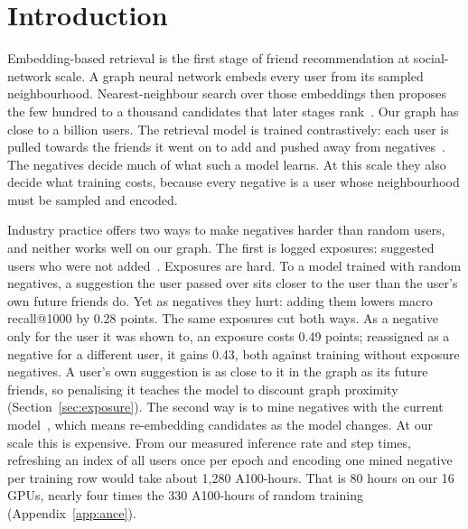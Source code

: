 \section{Introduction}
\label{sec:intro}

 Embedding-based retrieval is the first stage of friend recommendation at
social-network scale. A graph neural network embeds every user from its sampled neighbourhood. Nearest-neighbour search
over those embeddings then proposes the few hundred to a thousand candidates that later stages rank~\cite{huang2020ebr,ying2018graph,johnson2019billion}.
Our graph has close to a billion users. The retrieval model is trained contrastively: each user is pulled towards the
friends it went on to add and pushed away from negatives~\cite{yi2019sampling}. The negatives decide much of what such
a model learns. At this scale they also decide what training costs, because every negative is a user whose
neighbourhood must be sampled and encoded.

 Industry practice offers two ways to make negatives harder than random users, and
neither works well on our graph. The first is logged exposures: suggested users who were not
added~\cite{huang2020ebr}. Exposures are hard. To a model trained with random negatives, a suggestion the user passed
over sits closer to the user than the user's own future friends do. Yet as negatives they hurt: adding them lowers macro
recall@1000 by 0.28 points. The same exposures cut both ways. As a negative only for the user it was shown to, an exposure
costs 0.49 points; reassigned as a negative for a different user, it gains 0.43, both against training without
exposure negatives. A user's own suggestion is as close to it in the graph as its future
friends, so penalising it teaches the model to discount graph proximity (Section~\ref{sec:exposure}).
The second way is to mine negatives with the current model~\cite{xiong2021ance}, which
means re-embedding candidates as the model changes. At our scale this is expensive. From our measured inference rate
and step times, refreshing an index of all users once per epoch and encoding one mined negative per training row would
take about 1{,}280 A100-hours. That is 80 hours on our 16 GPUs, nearly four times the 330 A100-hours of random training
(Appendix~\ref{app:ance}).

